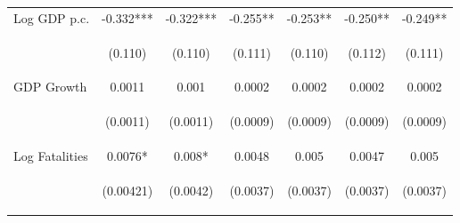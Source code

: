 \documentclass{article}
\begin{document}
\begin{table}[htbp]
{\begin{tabular}{lcccccc}
Log GDP p.c. & -0.332*** & -0.322*** & -0.255** & -0.253** & -0.250** & -0.249** \\
\vspace{4pt} & \begin{footnotesize}(0.110)\end{footnotesize} & \begin{footnotesize}(0.110)\end{footnotesize} & \begin{footnotesize}(0.111)\end{footnotesize} & \begin{footnotesize}(0.110)\end{footnotesize} & \begin{footnotesize}(0.112)\end{footnotesize} & \begin{footnotesize}(0.111)\end{footnotesize} \\
GDP Growth & 0.0011 & 0.001 & 0.0002 & 0.0002 & 0.0002 & 0.0002 \\
\vspace{4pt} & \begin{footnotesize}(0.0011)\end{footnotesize} & \begin{footnotesize}(0.0011)\end{footnotesize} & \begin{footnotesize}(0.0009)\end{footnotesize} & \begin{footnotesize}(0.0009)\end{footnotesize} & \begin{footnotesize}(0.0009)\end{footnotesize} & \begin{footnotesize}(0.0009)\end{footnotesize} \\
Log Fatalities & 0.0076* & 0.008* & 0.0048 & 0.005 & 0.0047 & 0.005 \\
\vspace{4pt} & \begin{footnotesize}(0.00421)\end{footnotesize} & \begin{footnotesize}(0.0042)\end{footnotesize} & \begin{footnotesize}(0.0037)\end{footnotesize} & \begin{footnotesize}(0.0037)\end{footnotesize} & \begin{footnotesize}(0.0037)\end{footnotesize} & \begin{footnotesize}(0.0037)\end{footnotesize} \\

\end{tabular}}
\end{table}
\end{document}
